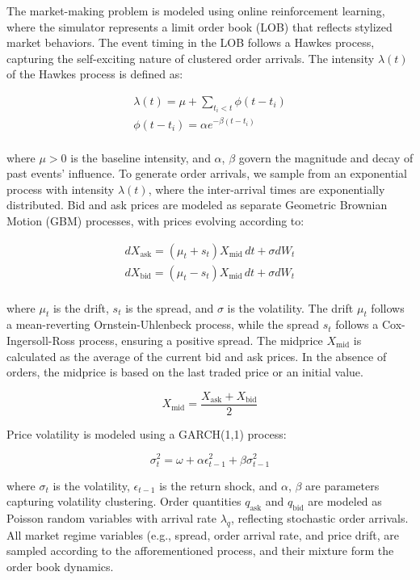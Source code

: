 \documentclass[11pt]{article}
\begin{document}
    The market-making problem is modeled using online reinforcement learning, where the simulator represents a
    limit order book (LOB) that reflects stylized market behaviors.
    The event timing in the LOB follows a Hawkes process, capturing the self-exciting nature of clustered order arrivals.
    The intensity \( \lambda(t) \) of the Hawkes process is defined as:

    \begin{gather*}
        \lambda(t) = \mu + \sum_{t_i < t} \phi(t - t_i)\\
        \phi(t - t_i) = \alpha e^{-\beta(t - t_i)}\\
    \end{gather*}

    where \( \mu > 0 \) is the baseline intensity, and \( \alpha \), \( \beta \) govern the magnitude and decay of past events' influence.
    To generate order arrivals, we sample from an exponential process with intensity \( \lambda(t) \),
    where the inter-arrival times are exponentially distributed.
    Bid and ask prices are modeled as separate Geometric Brownian Motion (GBM) processes, with prices evolving according to:

    \begin{gather*}
        dX_{\text{ask}} = (\mu_t + s_t) X_{\text{mid}} \, dt + \sigma dW_t\\
        dX_{\text{bid}} = (\mu_t - s_t) X_{\text{mid}} \, dt + \sigma dW_t\\
    \end{gather*}

    where \( \mu_t \) is the drift, \( s_t \) is the spread, and \( \sigma \) is the volatility.
    The drift \( \mu_t \) follows a mean-reverting Ornstein-Uhlenbeck process, while the spread \( s_t \) follows a Cox-Ingersoll-Ross process,
    ensuring a positive spread.
    The midprice \( X_{\text{mid}} \) is calculated as the average of the current bid and ask prices.
    In the absence of orders, the midprice is based on the last traded price or an initial value.

    \[
        X_{\text{mid}} = \frac{X_{\text{ask}} + X_{\text{bid}}}{2}
    \]

    Price volatility is modeled using a GARCH(1,1) process:

    \[
        \sigma_t^2 = \omega + \alpha \epsilon_{t-1}^2 + \beta \sigma_{t-1}^2
    \]

    where \( \sigma_t \) is the volatility, \( \epsilon_{t-1} \) is the return shock, and \( \alpha \), \( \beta \) are parameters capturing volatility clustering.
    Order quantities \( q_{\text{ask}} \) and \( q_{\text{bid}} \) are modeled as Poisson random variables with arrival rate \( \lambda_q \),
    reflecting stochastic order arrivals.
    All market regime variables (e.g., spread, order arrival rate, and price drift, are sampled according to the afforementioned process,
    and their mixture form the order book dynamics.
\end{document}
